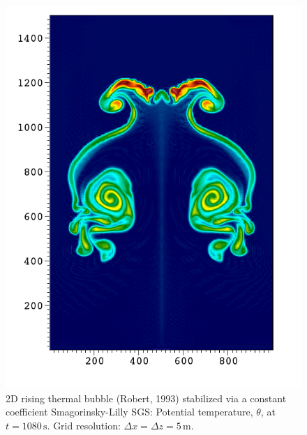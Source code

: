 \documentclass{report}
\begin{document}
{\begin{figure}[htbp]
\includegraphics[width=\textwidth]{figures/RTB-Robert--smgo-5mX5m-1080s0000.png}
\caption{2D rising thermal bubble (Robert, 1993) stabilized via a constant coefficient Smagorinsky-Lilly SGS: Potential temperature, $\theta$, at $t=1080\,\mathrm{s}$. Grid resolution: $\Delta x = \Delta z = 5\,\mathrm{m}$.}
\label{fig:benchmarks/robert5msmago}
\end{figure}

}
\end{document}
